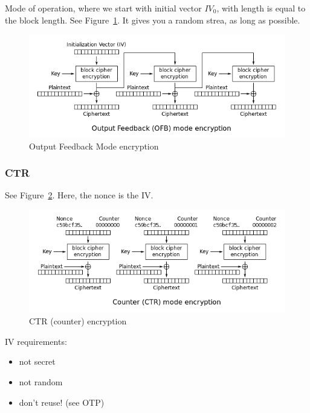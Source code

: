 \documentclass[language=english,number=]{homework}
\begin{document}
    Mode of operation, where we start with initial vector $IV_0$, with length is equal to the block length.
    See Figure~\ref{ofm}.
    It gives you a random strea, as long as possible.

    \begin{figure}
        \centering
        \includegraphics[width=\textwidth]{ofm.PNG}
        \caption{Output Feedback Mode encryption}
        \label{ofm}
    \end{figure}

    \subsubsection{CTR}

    See Figure~\ref{ctr}.
    Here, the nonce is the IV.

    \begin{figure}
        \centering
        \includegraphics[width=\textwidth]{ctr.PNG}
        \caption{CTR (counter) encryption}
        \label{ctr}
    \end{figure}

    IV requirements:
    \begin{itemize}
        \item not secret
        \item not random
        \item don't reuse! (see OTP)
    \end{itemize}
\end{document}
